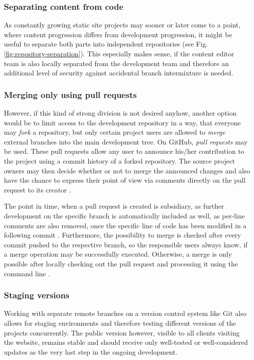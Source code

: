 \subsubsection{Separating content from code}
As constantly growing static site projects may sooner or later come to a point, where content progression differs from development progression, it might be useful to separate both parts into independent repositories (see Fig. \ref{fig:repository-separation}). This especially makes sense, if the content editor team is also locally separated from the development team and therefore an additional level of security against accidental branch intermixture is needed.

\subsubsection{Merging only using pull requests}
However, if this kind of strong division is not desired anyhow, another option would be to limit access to the development repository in a way, that everyone may \emph{fork} a repository, but only certain project users are allowed to \emph{merge} external branches into the main development tree. On GitHub, \emph{pull requests} may be used. These pull requests allow any user to announce his/her contribution to the project using a commit history of a forked repository. The source project owners may then decide whether or not to merge the announced changes and also have the chance to express their point of view via comments directly on the pull request to its creator \cite[p. 394f]{loeliger2012version}.

The point in time, when a pull request is created is subsidiary, as further development on the specific branch is automatically included as well, as per-line comments are also removed, once the specific line of code has been modified in a following commit \cite{GithubPullRequests}. Furthermore, the possibility to merge is checked after every commit pushed to the respective branch, so the responsible users always know, if a merge operation may be successfully executed. Otherwise, a merge is only possible after locally checking out the pull request and processing it using the command line \cite{GithubMergePullRequests}.

\subsubsection{Staging versions}
Working with separate remote branches on a version control system like Git also allows for staging environments and therefore testing different versions of the projects concurrently. The public version however, visible to all clients visiting the website, remains stable and should receive only well-tested or well-considered updates as the very last step in the ongoing development.

